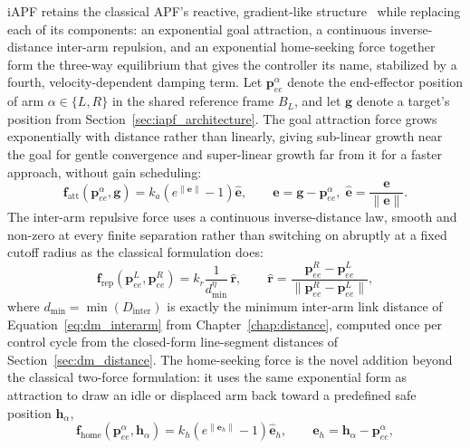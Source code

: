 iAPF retains the classical APF's reactive, gradient-like structure~\citep{khatib1986real} while
replacing each of its components: an exponential goal attraction, a continuous inverse-distance
inter-arm repulsion, and an exponential home-seeking force together form the three-way equilibrium
that gives the controller its name, stabilized by a fourth, velocity-dependent damping term. Let
$\mathbf{p}_{ee}^\alpha$ denote the end-effector position of arm $\alpha \in \{L, R\}$ in the shared reference
frame $B_L$, and let $\mathbf{g}$ denote a target's position from Section~\ref{sec:iapf_architecture}. The
goal attraction force grows exponentially with distance rather than linearly, giving sub-linear
growth near the goal for gentle convergence and super-linear growth far from it for a faster
approach, without gain scheduling:
\begin{equation}
\mathbf{f}_{\text{att}}(\mathbf{p}_{ee}^\alpha, \mathbf{g}) = k_a \left( e^{\lVert \mathbf{e} \rVert} - 1 \right) \hat{\mathbf{e}}, \qquad
\mathbf{e} = \mathbf{g} - \mathbf{p}_{ee}^\alpha,\; \hat{\mathbf{e}} = \frac{\mathbf{e}}{\lVert \mathbf{e} \rVert}.
\label{eq:iapf_attract}
\end{equation}
The inter-arm repulsive force uses a continuous inverse-distance law, smooth and non-zero at every
finite separation rather than switching on abruptly at a fixed cutoff radius as the classical
formulation does:
\begin{equation}
\mathbf{f}_{\text{rep}}(\mathbf{p}_{ee}^L, \mathbf{p}_{ee}^R) = k_r \frac{1}{d_{\min}^{\eta}}\, \hat{\mathbf{r}}, \qquad
\hat{\mathbf{r}} = \frac{\mathbf{p}_{ee}^R - \mathbf{p}_{ee}^L}{\lVert \mathbf{p}_{ee}^R - \mathbf{p}_{ee}^L \rVert},
\label{eq:iapf_repel}
\end{equation}
where $d_{\min} = \min(D_{\text{inter}})$ is exactly the minimum inter-arm link distance of
Equation~\eqref{eq:dm_interarm} from Chapter~\ref{chap:distance}, computed once per control cycle
from the closed-form line-segment distances of Section~\ref{sec:dm_distance}. The home-seeking
force is the novel addition beyond the classical two-force formulation: it uses the same exponential
form as attraction to draw an idle or displaced arm back toward a predefined safe position
$\mathbf{h}_\alpha$,
\begin{equation}
\mathbf{f}_{\text{home}}(\mathbf{p}_{ee}^\alpha, \mathbf{h}_\alpha) = k_h \left( e^{\lVert \mathbf{e}_h \rVert} - 1 \right) \hat{\mathbf{e}}_h,
\qquad \mathbf{e}_h = \mathbf{h}_\alpha - \mathbf{p}_{ee}^\alpha,
\label{eq:iapf_home}
\end{equation}

